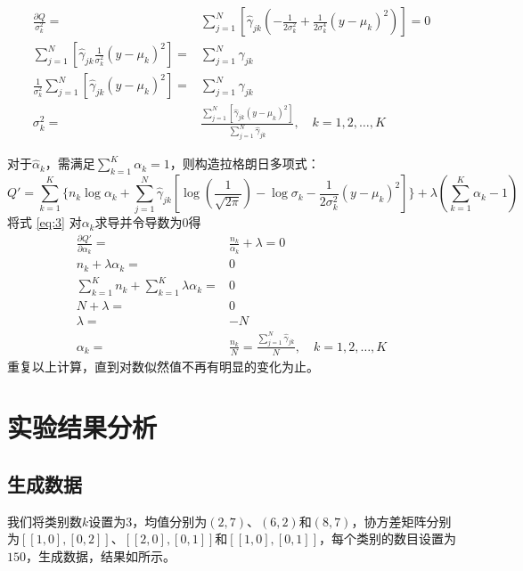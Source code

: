 \documentclass[lang=cn,11pt,a4paper,cite=authoryear]{elegantpaper}
\begin{document}
\begin{equation}
\begin{aligned}
	\frac{\partial Q}{\sigma^2_k} =& \sum_{j=1}^N[\hat{\gamma}_{jk}(-\frac{1}{2\sigma_k^2}+\frac{1}{2\sigma_k^4}(y-\mu_k)^2)]=0\\
	\sum_{j=1}^N[\hat{\gamma}_{jk}\frac{1}{\sigma_k^2}(y-\mu_k)^2]=&\sum_{j=1}^N\hat{\gamma}_{jk}\\
	\frac{1}{\sigma_k^2}\sum_{j=1}^N[\hat{\gamma}_{jk}(y-\mu_k)^2]=&\sum_{j=1}^N\hat{\gamma}_{jk}\\
	\sigma_k^2=&\frac{\sum_{j=1}^N[\hat{\gamma}_{jk}(y-\mu_k)^2]}{\sum_{j=1}^N\hat{\gamma}_{jk}}, \quad k=1,2,\dots,K
\end{aligned}
\end{equation}

对于$\hat{\alpha}_k$，需满足$\sum\limits_{k=1}^K\alpha_k=1$，则构造拉格朗日多项式：
\begin{equation}
Q'=\sum_{k=1}^K\{n_k\log \alpha_k+\sum_{j=1}^N\hat{\gamma}_{jk}[\log(\frac{1}{\sqrt{2\pi}})-\log\sigma_k-\frac{1}{2\sigma_k^2}(y-\mu_k)^2]\}+\lambda(\sum\limits_{k=1}^K\alpha_k-1)
\label{eq:3}
\end{equation}
将式 \ref{eq:3} 对$\alpha_k$求导并令导数为$0$得
\begin{equation}
\begin{aligned}
	\frac{\partial Q'}{\partial \alpha_k}=&\frac{n_k}{\alpha_k}+\lambda=0\\
	n_k+\lambda \alpha_k=&0\\
	\sum_{k=1}^Kn_k+\sum_{k=1}^K\lambda \alpha_k=&0\\
	N+\lambda=&0\\
	\lambda=&-N\\
	\alpha_k=&\frac{n_k}{N}=\frac{\sum_{j=1}^N\hat{\gamma}_{jk}}{N}, \quad k=1,2,\dots,K
\end{aligned}
\end{equation}
重复以上计算，直到对数似然值不再有明显的变化为止。

\section{实验结果分析}

\subsection{生成数据}
我们将类别数$k$设置为$3$，均值分别为$(2,7)$、$(6,2)$和$(8,7)$，协方差矩阵分别为$[[1, 0], [0, 2]]$、$[[2, 0], [0, 1]]$和$[[1, 0], [0, 1]]$，每个类别的数目设置为$150$，生成数据，结果如所示。
\end{document}
